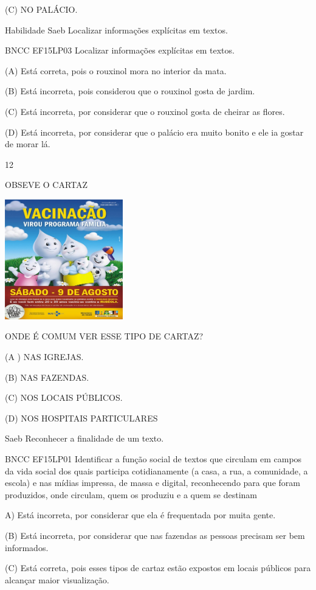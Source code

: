 {{{{{{(C) NO PALÁCIO.

Habilidade Saeb Localizar informações explícitas em textos.

BNCC EF15LP03 Localizar informações explícitas em textos.

(A) Está correta, pois o rouxinol mora no interior da mata.

(B) Está incorreta, pois considerou que o rouxinol gosta de jardim.

(C) Está incorreta, por considerar que o rouxinol gosta de cheirar as
flores.

(D) Está incorreta, por considerar que o palácio era muito bonito e ele
ia gostar de morar lá.

\num{12}

OBSEVE O CARTAZ

\includegraphics[width=2.01806in,height=2.05069in]{media/image159.jpeg}

ONDE É COMUM VER ESSE TIPO DE CARTAZ?

(A ) NAS IGREJAS.

(B) NAS FAZENDAS.

(C) NOS LOCAIS PÚBLICOS.

(D) NOS HOSPITAIS PARTICULARES

Saeb Reconhecer a finalidade de um texto.

BNCC EF15LP01 Identificar a função social de textos que circulam em
campos da vida social dos quais participa cotidianamente (a casa, a rua,
a comunidade, a escola) e nas mídias impressa, de massa e digital,
reconhecendo para que foram produzidos, onde circulam, quem os produziu
e a quem se destinam

A) Está incorreta, por considerar que ela é frequentada por muita gente.

(B) Está incorreta, por considerar que nas fazendas as pessoas precisam
ser bem informados.

(C) Está correta, pois esses tipos de cartaz estão expostos em locais
públicos para alcançar maior visualização.

}}}}}}
